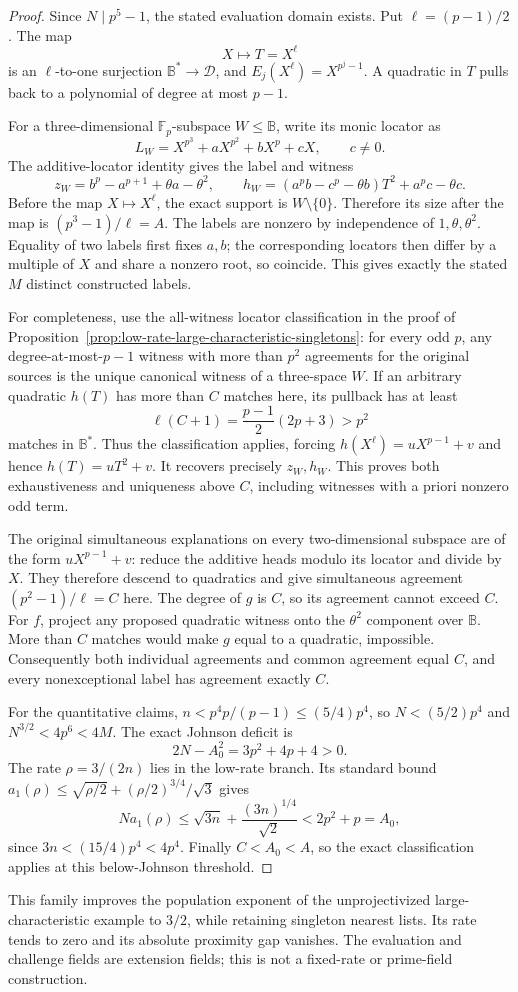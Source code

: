 \begin{proof}
Since $N\mid p^5-1$, the stated evaluation domain exists. Put
$\ell=(p-1)/2$. The map
\[
 X\longmapsto T=X^\ell
\]
is an $\ell$-to-one surjection $\mathbb B^*\to\mathcal D$, and
$E_j(X^\ell)=X^{p^j-1}$. A quadratic in $T$ pulls back to a polynomial
of degree at most $p-1$.

For a three-dimensional $\mathbb F_p$-subspace $W\le\mathbb B$, write
its monic locator as
\[
 L_W=X^{p^3}+aX^{p^2}+bX^p+cX,\qquad c\ne0.
\]
The additive-locator identity gives the label and witness
\[
 z_W=b^p-a^{p+1}+\theta a-\theta^2,\qquad
 h_W=(a^pb-c^p-\theta b)T^2+a^pc-\theta c.
\]
Before the map $X\mapsto X^\ell$, the exact support is
$W\setminus\{0\}$. Therefore its size after the map is
$(p^3-1)/\ell=A$.
The labels are nonzero by independence of $1,\theta,\theta^2$.
Equality of two labels first fixes $a,b$; the corresponding locators
then differ by a multiple of $X$ and share a nonzero root, so coincide.
This gives exactly the stated $M$ distinct constructed labels.

For completeness, use the all-witness locator classification in the
proof of Proposition~\ref{prop:low-rate-large-characteristic-singletons}:
for every odd $p$, any degree-at-most-$p-1$ witness with more than $p^2$
agreements for the original sources is the unique canonical witness
of a three-space $W$.
If an arbitrary quadratic $h(T)$ has more than $C$ matches here, its
pullback has at least
\[
 \ell(C+1)=\frac{p-1}{2}(2p+3)>p^2
\]
matches in $\mathbb B^*$. Thus the classification applies, forcing
$h(X^\ell)=uX^{p-1}+v$ and hence $h(T)=uT^2+v$.
It recovers precisely $z_W,h_W$. This proves both exhaustiveness and
uniqueness above $C$, including witnesses with a priori nonzero odd term.

The original simultaneous explanations on every two-dimensional
subspace are of the form $uX^{p-1}+v$: reduce the additive heads modulo
its locator and divide by $X$. They therefore descend to quadratics
and give simultaneous agreement $(p^2-1)/\ell=C$ here. The degree of
$g$ is $C$, so its agreement cannot exceed $C$. For $f$, project any proposed quadratic witness onto the
$\theta^2$ component over $\mathbb B$.
More than $C$ matches would make $g$ equal to a quadratic, impossible.
Consequently both individual agreements and common agreement equal
$C$, and every nonexceptional label has agreement exactly $C$.

For the quantitative claims, $n<p^4p/(p-1)\le(5/4)p^4$, so
$N<(5/2)p^4$ and $N^{3/2}<4p^6<4M$.
The exact Johnson deficit is
\[
 2N-A_0^2=3p^2+4p+4>0.
\]
The rate $\rho=3/(2n)$ lies in the low-rate branch. Its standard bound
$a_1(\rho)\le\sqrt{\rho/2}+(\rho/2)^{3/4}/\sqrt3$ gives
\[
 Na_1(\rho)\le\sqrt{3n}+\frac{(3n)^{1/4}}{\sqrt2}
 <2p^2+p=A_0,
\]
since $3n<(15/4)p^4<4p^4$. Finally $C<A_0<A$, so the exact
classification applies at this below-Johnson threshold.
\end{proof}

This family improves the population exponent of the unprojectivized
large-characteristic example to $3/2$, while retaining singleton nearest
lists. Its rate tends to zero and its absolute proximity gap vanishes.
The evaluation and challenge fields are extension fields; this is not
a fixed-rate or prime-field construction.
